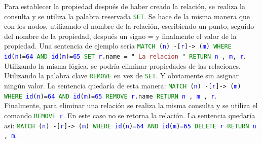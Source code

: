 \documentclass[conference]{IEEEtran}
\begin{document}
Para establecer la propiedad después de haber creado la relación, se realiza la consulta y se utiliza la palabra reservada \texttt{\textcolor{green}{SET}}. Se hace de la misma manera que con los nodos, utilizando el nombre de la relación, escribiendo un punto, seguido del nombre de la propiedad, después un signo = y finalmente el valor de la propiedad. Una sentencia de ejemplo sería \texttt{\textcolor{green}{MATCH} (\textcolor{blue}{n}) -[\textcolor{blue}{r}]-> (\textcolor{blue}{m}) \textcolor{green}{WHERE} \textcolor{blue}{id}(\textcolor{blue}{n})=\textcolor{blue}{64} \textcolor{green}{AND} \textcolor{blue}{id}(\textcolor{blue}{m})=\textcolor{blue}{65} \textcolor{green}{SET} \textcolor{blue}{r}.name = " \textcolor{brown}{La relacion} " \textcolor{green}{RETURN} \textcolor{blue}{n} , \textcolor{blue}{m},  \textcolor{blue}{r}}.
\\
Utilizando la misma lógica, se podría eliminar propiedades de las relaciones. Utilizando la palabra clave \texttt{\textcolor{green}{REMOVE}} en vez de \texttt{\textcolor{green}{SET}}. Y obviamente sin asignar ningún valor. La sentencia quedaría de esta manera:  \texttt{\textcolor{green}{MATCH} (\textcolor{blue}{n}) -[\textcolor{blue}{r}]-> (\textcolor{blue}{m}) \textcolor{green}{WHERE} \textcolor{blue}{id}(\textcolor{blue}{n})=\textcolor{blue}{64} \textcolor{green}{AND} \textcolor{blue}{id}(\textcolor{blue}{m})=\textcolor{blue}{65} \textcolor{green}{REMOVE} \textcolor{blue}{r}.name \textcolor{green}{RETURN} \textcolor{blue}{n} , \textcolor{blue}{m} , \textcolor{blue}{r}}.
\\
Finalmente, para eliminar una relación se realiza la misma consulta y se utiliza el comando \texttt{\textcolor{green}{REMOVE} \textcolor{blue}{r}}. En este caso no se retorna la relación. La sentencia quedaría así: \texttt{\textcolor{green}{MATCH} (\textcolor{blue}{n}) -[\textcolor{blue}{r}]-> (\textcolor{blue}{m}) \textcolor{green}{WHERE} \textcolor{blue}{id}(\textcolor{blue}{n})=\textcolor{blue}{64} \textcolor{green}{AND} \textcolor{blue}{id}(\textcolor{blue}{m})=\textcolor{blue}{65} \textcolor{green}{DELETE} \textcolor{blue}{r} \textcolor{green}{RETURN} \textcolor{blue}{n} , \textcolor{blue}{m}}.
\end{document}
